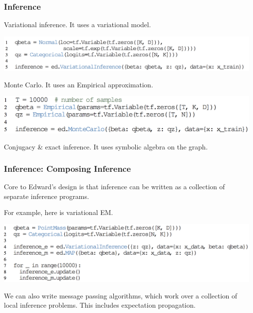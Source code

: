\documentclass[10pt,
               xcolor={usenames,dvipsnames},
               hyperref={colorlinks,linktoc=all,citecolor=Plum,linkcolor=MidnightBlue,urlcolor=MidnightBlue},noamssymb]{beamer}
\begin{document}
\begin{frame}
\frametitle{Inference}
Variational inference. It uses a variational model.
\begin{center}
\vspace{-2.0ex}
\includegraphics[height=0.18\textheight]{img/inference_variational.png}
\end{center}
Monte Carlo. It uses an Empirical approximation.
\begin{center}
\includegraphics[height=0.17\textheight]{img/inference_monte.png}
\end{center}

Conjugacy \& exact inference. It uses symbolic algebra on the graph.
\end{frame}

\begin{frame}
\frametitle{Inference: Composing Inference}
Core to Edward's design is that inference can be written as a collection of separate inference programs.

For example, here is variational EM.

\begin{center}
\includegraphics[height=0.275\textheight]{img/composing.png}
\end{center}

We can also write message passing algorithms, which work over a collection of local inference problems. This includes expectation propagation.
\end{frame}
\end{document}
